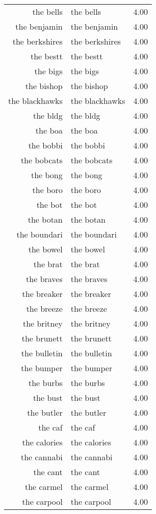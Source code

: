\begin{table}[ht]
\begin{tabular}{rlr}
  the bells & the bells & 4.00 \\ 
  the benjamin & the benjamin & 4.00 \\ 
  the berkshires & the berkshires & 4.00 \\ 
  the bestt & the bestt & 4.00 \\ 
  the bigs & the bigs & 4.00 \\ 
  the bishop & the bishop & 4.00 \\ 
  the blackhawks & the blackhawks & 4.00 \\ 
  the bldg & the bldg & 4.00 \\ 
  the boa & the boa & 4.00 \\ 
  the bobbi & the bobbi & 4.00 \\ 
  the bobcats & the bobcats & 4.00 \\ 
  the bong & the bong & 4.00 \\ 
  the boro & the boro & 4.00 \\ 
  the bot & the bot & 4.00 \\ 
  the botan & the botan & 4.00 \\ 
  the boundari & the boundari & 4.00 \\ 
  the bowel & the bowel & 4.00 \\ 
  the brat & the brat & 4.00 \\ 
  the braves & the braves & 4.00 \\ 
  the breaker & the breaker & 4.00 \\ 
  the breeze & the breeze & 4.00 \\ 
  the britney & the britney & 4.00 \\ 
  the brunett & the brunett & 4.00 \\ 
  the bulletin & the bulletin & 4.00 \\ 
  the bumper & the bumper & 4.00 \\ 
  the burbs & the burbs & 4.00 \\ 
  the bust & the bust & 4.00 \\ 
  the butler & the butler & 4.00 \\ 
  the caf & the caf & 4.00 \\ 
  the calories & the calories & 4.00 \\ 
  the cannabi & the cannabi & 4.00 \\ 
  the cant & the cant & 4.00 \\ 
  the carmel & the carmel & 4.00 \\ 
  the carpool & the carpool & 4.00 \\ 

\end{tabular}
\end{table}

